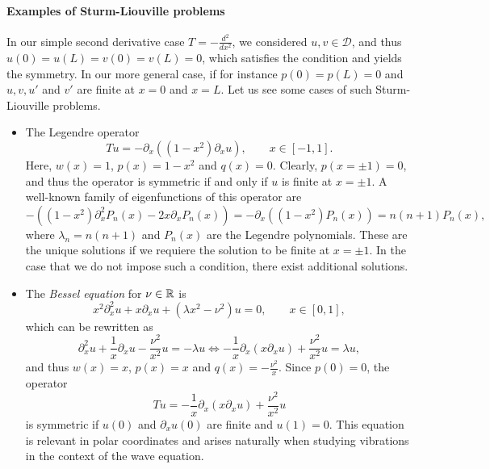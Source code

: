 \paragraph{Examples of Sturm-Liouville problems} In our simple second derivative case $T=-\frac{d^2}{dx^2}$, we considered $u,v\in\mathcal{D}$, and thus $u(0)=u(L)=v(0)=v(L)=0$, which satisfies the condition and yields the symmetry. In our more general case, if for instance $p(0)=p(L)=0$ and $u,v,u'$ and $v'$ are finite at $x=0$ and $x=L$. Let us see some cases of such Sturm-Liouville problems. 
\begin{itemize}
    \item The Legendre operator 
    \begin{equation}
        Tu = -\partial_x ((1-x^2)\partial_x u),\qquad x\in[-1,1].
    \end{equation}
    Here, $w(x)=1$, $p(x)=1-x^2$ and $q(x)=0$. Clearly, $p(x=\pm 1) = 0$, and thus the operator is symmetric if and only if $u$ is finite at $x = \pm 1$. A well-known family of eigenfunctions of this operator are 
    \begin{equation*}
        -((1-x^2)\partial_x^2 P_n(x) - 2x\partial_x P_n(x)) = -\partial_x ((1-x^2)P_n(x)) = n(n+1)P_n(x),
    \end{equation*}
    where $\lambda_n = n(n+1)$ and $P_n(x)$ are the Legendre polynomials. These are the unique solutions if we requiere the solution to be finite at $x= \pm 1$. In the case that we do not impose such a condition, there exist additional solutions. 
    \item The \emph{Bessel equation} for $\nu\in\mathbb{R}$ is 
    \begin{equation}
        x^2 \partial_x^2 u + x\partial_x u + (\lambda x^2 - \nu^2)u = 0,\qquad x\in[0,1],
    \end{equation}
    which can be rewritten as 
    \begin{equation}
        \partial_x^2 u + \frac{1}{x}\partial_x u - \frac{\nu^2}{x^2}u = -\lambda u \iff -\frac{1}{x}\partial_x (x\partial_x u) + \frac{\nu^2}{x^2} u = \lambda u,
    \end{equation}
    and thus $w(x)=x$, $p(x)=x$ and $q(x)=-\frac{\nu^2}{x}$. Since $p(0)=0$, the operator 
    \begin{equation*}
        Tu = -\frac{1}{x}\partial_x (x\partial_x u) + \frac{\nu^2}{x^2}u
    \end{equation*}
    is symmetric if $u(0)$ and $\partial_x u(0)$ are finite and $u(1)=0$. This equation is relevant in polar coordinates and arises naturally when studying vibrations in the context of the wave equation. 

\end{itemize}
